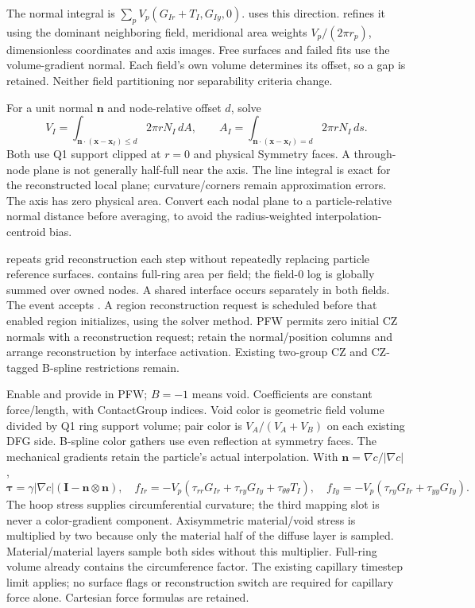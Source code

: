 The normal integral is $\sum_p V_p(G_{Ir}+T_I,G_{Iy},0)$.
 uses this direction.
 refines it using the dominant neighboring field,
meridional area weights $V_p/(2\pi r_p)$, dimensionless coordinates and axis
images. Free surfaces and failed fits use the volume-gradient normal. Each
field's own volume determines its offset, so a gap is retained. Neither field
partitioning nor separability criteria change.

For a unit normal $\boldsymbol n$ and node-relative offset $d$, solve
\[
 V_I=\int_{\boldsymbol n\cdot(\boldsymbol x-\boldsymbol x_I)\le d}
       2\pi rN_I\,dA,\qquad
 A_I=\int_{\boldsymbol n\cdot(\boldsymbol x-\boldsymbol x_I)=d}
       2\pi rN_I\,ds.
\]
Both use Q1 support clipped at $r=0$ and physical Symmetry faces. A through-node
plane is not generally half-full near the axis. The line integral is exact
for the reconstructed local plane; curvature/corners remain approximation
errors. The axis has zero physical area. Convert each nodal plane to a
particle-relative normal distance before averaging, to avoid the
radius-weighted interpolation-centroid bias.

 repeats grid reconstruction each step without
repeatedly replacing particle reference surfaces. 
contains full-ring area per field; the field-0 log is globally summed over
owned nodes. A shared interface occurs separately in both fields.
The  event accepts
. A region reconstruction request is
scheduled before that enabled region initializes, using the solver method.
PFW permits zero initial CZ normals with a reconstruction request; retain the
normal/position columns and arrange reconstruction by interface activation.
Existing two-group CZ and CZ-tagged B-spline restrictions remain.

Enable  and provide
 in PFW; $B=-1$ means void.
Coefficients are constant force/length, with ContactGroup indices. Void color
is geometric field volume divided by Q1 ring support volume; pair color is
$V_A/(V_A+V_B)$ on each existing DFG side. B-spline color gathers use even
reflection at symmetry faces. The mechanical gradients retain the particle's
actual interpolation. With $\boldsymbol n=\nabla c/|\nabla c|$,
\[
 \boldsymbol\tau=\gamma|\nabla c|(\boldsymbol I-\boldsymbol n\otimes\boldsymbol n),
 \quad f_{Ir}=-V_p(\tau_{rr}G_{Ir}+\tau_{ry}G_{Iy}+\tau_{\theta\theta}T_I),
 \quad f_{Iy}=-V_p(\tau_{ry}G_{Ir}+\tau_{yy}G_{Iy}).
\]
The hoop stress supplies circumferential curvature; the third mapping slot
is never a color-gradient component. Axisymmetric material/void stress is
multiplied by two because only the material half of the diffuse layer is
sampled. Material/material layers sample both sides without this multiplier.
Full-ring volume already contains the circumference factor. The existing
capillary timestep limit applies; no surface flags or reconstruction switch
are required for capillary force alone. Cartesian force formulas are retained.

